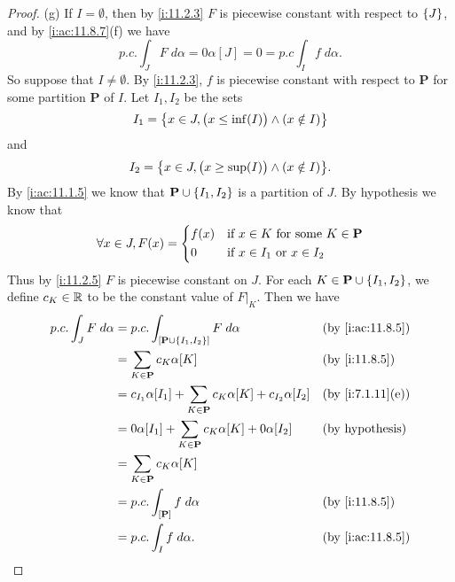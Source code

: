 \begin{proof}{(g)}
  If \(I = \emptyset\), then by \cref{i:11.2.3} \(F\) is piecewise constant with respect to \(\left\lbrace J\right\rbrace\), and by \cref{i:ac:11.8.7}(f) we have
  \[
    p.c. \int_J F \; d \alpha = 0 \alpha[J] = 0 = p.c \int_I f \; d \alpha.
  \]
  So suppose that \(I \neq \emptyset\).
  By \cref{i:11.2.3}, \(f\) is piecewise constant with respect to \(\mathbf{P}\) for some partition \(\mathbf{P}\) of \(I\).
  Let \(I_1, I_2\) be the sets
  \[
    I_1 = \left\lbrace x \in J, \big(x \leq \inf(I)\big) \land (x \notin I)\right\rbrace
  \]
  and
  \[
    I_2 = \set{x \in J, \big(x \geq \sup(I)\big) \land (x \notin I)}.
  \]
  By \cref{i:ac:11.1.5} we know that \(\mathbf{P} \cup \left\lbrace I_1, I_2\right\rbrace\) is a partition of \(J\).
  By hypothesis we know that
  \[
    \forall x \in J, F(x) = \begin{dcases}
      f(x) & \text{if } x \in K \text{ for some } K \in \mathbf{P} \\
      0    & \text{if } x \in I_1 \text{ or } x \in I_2
    \end{dcases}
  \]
  Thus by \cref{i:11.2.5} \(F\) is piecewise constant on \(J\).
  For each \(K \in \mathbf{P} \cup \left\lbrace I_1, I_2\right\rbrace\), we define \(c_K \in \mathbb{R}\) to be the constant value of \(F|_K\).
  Then we have
  \begin{align*}
    p.c. \int_J F \; d \alpha & = p.c. \int_{[\mathbf{P} \cup \set{I_1, I_2}]} F \; d \alpha                        &  & \by{i:ac:11.8.5}       \\
                              & = \sum_{K \in \mathbf{P}} c_K \alpha[K]                                             &  & \by{i:11.8.5}          \\
                              & = c_{I_1} \alpha[I_1] + \sum_{K \in \mathbf{P}} c_K \alpha[K] + c_{I_2} \alpha[I_2] &  & \by{i:7.1.11}[e]       \\
                              & = 0 \alpha[I_1] + \sum_{K \in \mathbf{P}} c_K \alpha[K] + 0 \alpha[I_2]             &  & \text{(by hypothesis)} \\
                              & = \sum_{K \in \mathbf{P}} c_K \alpha[K]                                                                         \\
                              & = p.c. \int_{[\mathbf{P}]} f \; d \alpha                                            &  & \by{i:11.8.5}          \\
                              & = p.c. \int_I f \; d \alpha.                                                        &  & \by{i:ac:11.8.5}
  \end{align*}
\end{proof}

